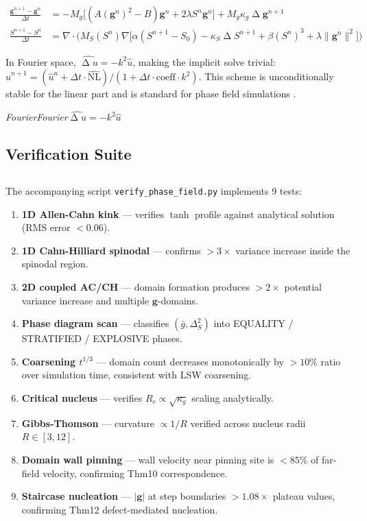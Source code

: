 \documentclass[12pt,a4paper]{article}
\theoremstyle{plain}
\theoremstyle{definition}
\newcommand{\gf}{\mathbf{g}}          %
\newcommand{\Sf}{S}                   %
\newcommand{\Rc}{R_c}                 %
\newcommand{\gbar}{\bar{g}}           %
\DeclareMathOperator{\lap}{\Delta}
\newcommand{\cn}[1]{\textcolor{scxgray}{\textit{#1}}}
\begin{document}
\begin{align}
    \frac{\gf^{n+1} - \gf^n}{\Delta t} &=
    -M_g\big[(A(\gf^n)^2 - B)\gf^n + 2\lambda\Sf^n\gf^n\big]
    + M_g\kappa_g \lap \gf^{n+1} \\[4pt]
    \frac{\Sf^{n+1} - \Sf^n}{\Delta t} &=
    \nabla\cdot\big(M_S(\Sf^n)\nabla\big[
        \alpha(\Sf^{n+1}-\Sf_0) - \kappa_S\lap\Sf^{n+1}
        + \beta(\Sf^n)^3 + \lambda\|\gf^n\|^2
    \big]\big)
\end{align}

In Fourier space, $\widehat{\lap u} = -k^2\hat{u}$, making the implicit
solve trivial: $\hat{u}^{n+1} = (\hat{u}^n + \Delta t\cdot\widehat{\text{NL}})
/ (1 + \Delta t\cdot\text{coeff}\cdot k^2)$. This scheme is unconditionally
stable for the linear part and is standard for phase field simulations
\cite{chen2002}.

\bigskip
\noindent
\cn{FourierFourier$\widehat{\lap u}=-k^2\hat{u}$}

\subsection{Verification Suite}
\subsection*{}

The accompanying script \texttt{verify\_phase\_field.py} implements 9 tests:

\begin{enumerate}[label=(\arabic*)]
    \item \textbf{1D Allen-Cahn kink} — verifies $\tanh$ profile against
          analytical solution (RMS error $< 0.06$).
    \item \textbf{1D Cahn-Hilliard spinodal} — confirms $>3\times$ variance
          increase inside the spinodal region.
    \item \textbf{2D coupled AC/CH} — domain formation produces
          $>2\times$ potential variance increase and multiple $\gf$-domains.
    \item \textbf{Phase diagram scan} — classifies $(\gbar, \Delta_S^2)$
          into EQUALITY / STRATIFIED / EXPLOSIVE phases.
    \item \textbf{Coarsening $t^{1/3}$} — domain count decreases monotonically
          by $>10\%$ ratio over simulation time, consistent with LSW coarsening.
    \item \textbf{Critical nucleus} — verifies $\Rc \propto \sqrt{\kappa_g}$
          scaling analytically.
    \item \textbf{Gibbs-Thomson} — curvature $\propto 1/R$ verified across
          nucleus radii $R \in [3, 12]$.
    \item \textbf{Domain wall pinning} — wall velocity near pinning site is
          $< 85\%$ of far-field velocity, confirming Thm10 correspondence.
    \item \textbf{Staircase nucleation} — $|\gf|$ at step boundaries $> 1.08\times$
          plateau values, confirming Thm12 defect-mediated nucleation.
\end{enumerate}
\end{document}
